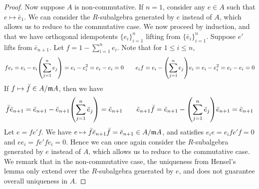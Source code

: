 \begin{proof}
    Now suppose \(A\) is non-commutative.
    If \(n = 1\), consider any \(e \in A\) such that \(e \mapsto \bar{e}_1\).
    We can consider the \(R\)-subalgebra generated by \(e\) instead of \(A\),
    which allows us to reduce to the commutative case.
    We now proceed by induction, and that we have orthogonal idempotents \({\{e_i\}}_{i=1}^n\)
    lifting from \({\{\bar{e}_i\}}_{i=1}^n\).
    Suppose \(e'\) lifts from \(\bar{e}_{n+1}\).
    Let \(f = 1 - \sum_{i=1}^n e_i\).
    Note that for \(1 \leq i \leq n\),
    \begin{equation*}
        fe_i = e_i - e_i\pqty{\sum_{j=1}^n e_j} = e_i - e_i^2 = e_i - e_i = 0 \qquad
        e_i f = e_i - \pqty{\sum_{j=1}^n e_j}e_i = e_i - e_i^2 = e_i - e_i = 0
    \end{equation*}
    If \(f \mapsto \bar{f} \in A/\mathfrak{m}A\), then we have
    \begin{align*}
        \bar{f}\bar{e}_{n+1} = \bar{e}_{n+1} - \bar{e}_{n+1}\pqty{\sum_{j=1}^n \bar{e}_j} = \bar{e}_{n+1} \qquad
        \bar{e}_{n+1}\bar{f} = \bar{e}_{n+1} - \pqty{\sum_{j=1}^n \bar{e}_j}\bar{e}_{n+1} = \bar{e}_{n+1}
    \end{align*}
    Let \(e = fe'f\).
    We have \(e \mapsto \bar{f}\bar{e}_{n+1}\bar{f} = \bar{e}_{n+1} \in A/\mathfrak{m}A\),
    and satisfies \(e_i e = e_i fe'f = 0\) and \(ee_i = fe'fe_i = 0\).
    Hence we can once again consider the \(R\)-subalgebra generated by \(e\) instead of \(A\),
    which allows us to reduce to the commutative case.
    We remark that in the non-commutative case,
    the uniqueness from Hensel's lemma only extend over the \(R\)-subalgebra generated by \(e\),
    and does not guarantee overall uniqueness in \(A\).
\end{proof}
    